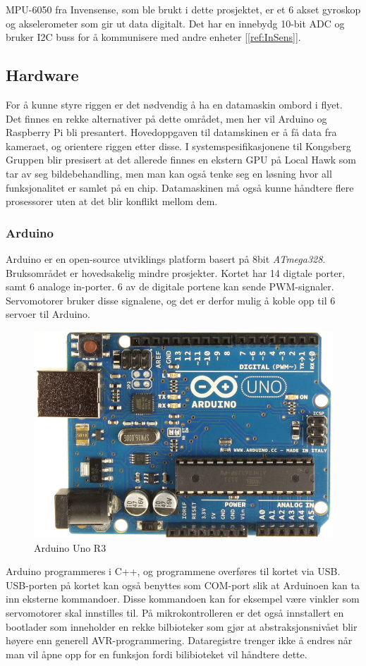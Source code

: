MPU-6050 fra Invensense, som ble brukt i dette prosjektet, er et 6 akset gyroskop og akselerometer som gir ut data digitalt. Det har en innebydg 10-bit ADC og bruker I2C buss for å kommunisere med andre enheter [\ref{ref:InSens}]. 


\subsection{Hardware}
For å kunne styre riggen er det nødvendig å ha en datamaskin ombord i flyet. Det finnes en rekke alternativer på dette området, men her vil Arduino og Raspberry Pi bli presantert. Hovedoppgaven til datamskinen er å få data fra kameraet, og orientere riggen etter disse. I systemspesifikasjonene til Kongsberg Gruppen blir presisert at det allerede finnes en ekstern GPU på Local Hawk som tar av seg bildebehandling, men man kan også tenke seg en løsning hvor all funksjonalitet er samlet på en chip. Datamaskinen må også kunne håndtere flere prosessorer uten at det blir konflikt mellom dem. 

\subsubsection{Arduino}
Arduino er en open-source utviklings platform basert på 8bit \textit{ATmega328}. Bruksområdet er hovedsakelig mindre prosjekter. Kortet har 14 digtale porter, samt 6 analoge in-porter. 6 av de digitale portene kan sende PWM-signaler. Servomotorer bruker disse signalene, og det er derfor mulig å koble opp til 6 servoer til Arduino. 
\begin{figure}[h!]
\centering
\includegraphics[scale = 0.25]{img/arduinoBoard.jpg}
\caption{Arduino Uno R3}
\end{figure}
Arduino programmeres i C++, og programmene overføres til kortet via USB. USB-porten på kortet kan også benyttes som COM-port slik at Arduinoen kan ta inn eksterne kommandoer. Disse kommandoen kan for eksempel være vinkler som servomotorer skal innstilles til. På mikrokontrolleren er det også innstallert en bootlader som inneholder en rekke bilbioteker som gjør at abstraksjonsnivået blir høyere enn generell AVR-programmering. Dataregistre trenger ikke å endres når man vil åpne opp for en funksjon fordi bilibioteket vil håndtere dette. 

